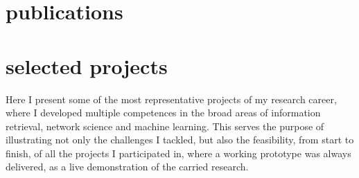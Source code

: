 \documentclass{friggeri-cv}
\newif\ifselectedprojects
\begin{document}
\section{publications}

\clearpage
{}


\ifselectedprojects

\clearpage

\section{selected projects}

Here I present some of the most representative projects of my research career, where I developed multiple competences in the broad areas of information retrieval, network science and machine learning. This serves the purpose of illustrating not only the challenges I tackled, but also the feasibility, from start to finish, of all the projects I participated in, where a working prototype was always delivered, as a live demonstration of the carried research.\\
\end{document}
